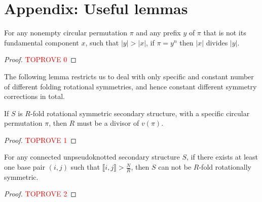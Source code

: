 \section{Appendix: Useful lemmas}\label{sec:lemmasApp}
\begin{lemma}[factors of $\pi$]\label{lem:factors}
	For any nonempty circular permutation $\pi$ 
	and any prefix $y$ of $\pi$ that is not its fundamental component $x$, 
	such that $|y|>|x|$, 
	if $\pi = y^n$ then $|x|$ divides $|y|$.    
\end{lemma}
\begin{proof}\textcolor{red}{TOPROVE 0}\end{proof}


The following lemma restricts us to deal with only specific and constant number of different folding rotational symmetries, and hence constant different symmetry corrections in total. 
\begin{lemma}\label{lem:div}
	If $S$ is $R$-fold rotational symmetric secondary structure, with a specific circular permutation $\pi$, then $R$ must be a divisor of $v(\pi)$.
\end{lemma}

\begin{proof}\textcolor{red}{TOPROVE 1}\end{proof}



\begin{lemma} \label{lem:nobase}
	For any connected unpseudoknotted secondary structure $S$, if there exists at least one base pair $(i,j)$ such that $\llbracket i,j \rrbracket > \frac{N}{R}$, then $S$ can not be  $R$-fold rotationally symmetric. 
\end{lemma}
\begin{proof}\textcolor{red}{TOPROVE 2}\end{proof}




